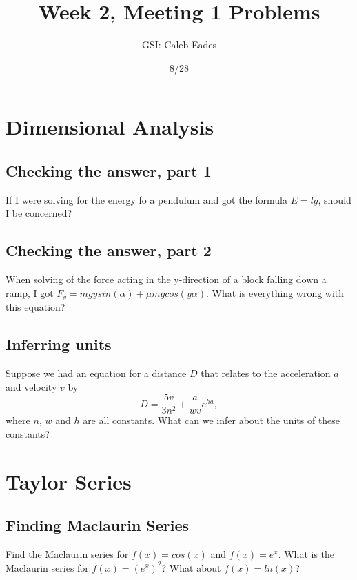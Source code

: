 \documentclass{article}
\begin{document}
	
\title{Week 2, Meeting 1 Problems}
\author{GSI: Caleb Eades}
\date{8/28}
\maketitle

\section{Dimensional Analysis}

\subsection{Checking the answer, part 1}

If I were solving for the energy fo a pendulum and got the formula $E=lg$, should I be concerned?

\subsection{Checking the answer, part 2}

When solving of the force acting in the y-direction of a block falling down a ramp, I got $F_y=mgysin(\alpha) + \mu mgcos(y\alpha)$. What is everything wrong with this equation?

\subsection{Inferring units}

Suppose we had an equation for a distance $D$ that relates to the acceleration $a$ and velocity $v$ by
\begin{equation}
D = \frac{5v}{3n^2} + \frac{a}{wv}e^{ha},
\end{equation}
where $n$, $w$ and $h$ are all constants. What can we infer about the units of these constants?

\newpage

\section{Taylor Series}

\subsection{Finding Maclaurin Series}

Find the Maclaurin series for $f(x) = cos(x)$ and $f(x)=e^x$. What is the Maclaurin series for $f(x)=(e^x)^2$? What about $f(x)=ln(x)$?
\end{document}

